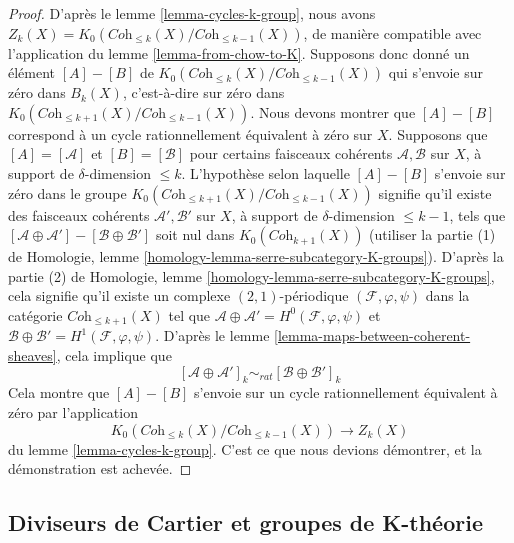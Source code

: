 \begin{proof}
D'après le lemme \ref{lemma-cycles-k-group}, nous avons
$Z_k(X) = K_0(\textit{Coh}_{\leq k}(X)/\textit{Coh}_{\leq k - 1}(X))$,
de manière compatible avec l'application du lemme \ref{lemma-from-chow-to-K}.
Supposons donc donné un élément $[A] - [B]$ de
$K_0(\textit{Coh}_{\leq k}(X)/\textit{Coh}_{\leq k - 1}(X))$
qui s'envoie sur zéro dans $B_k(X)$, c'est-à-dire sur zéro dans
$K_0(\textit{Coh}_{\leq k + 1}(X)/\textit{Coh}_{\leq k - 1}(X))$.
Nous devons montrer que $[A] - [B]$ correspond à un cycle
rationnellement équivalent à zéro sur $X$.
Supposons que $[A] = [\mathcal{A}]$ et $[B] = [\mathcal{B}]$
pour certains faisceaux cohérents $\mathcal{A}, \mathcal{B}$ sur
$X$, à support de $\delta$-dimension $\leq k$.
L'hypothèse selon laquelle $[A] - [B]$ s'envoie sur zéro dans le groupe
$K_0(\textit{Coh}_{\leq k + 1}(X)/\textit{Coh}_{\leq k - 1}(X))$
signifie qu'il existe des faisceaux cohérents
$\mathcal{A}', \mathcal{B}'$ sur $X$, à support de
$\delta$-dimension $\leq k - 1$, tels que
$[\mathcal{A} \oplus \mathcal{A}'] - [\mathcal{B} \oplus \mathcal{B}']$
soit nul dans $K_0(\textit{Coh}_{k + 1}(X))$ (utiliser la partie (1) de
Homologie, lemme \ref{homology-lemma-serre-subcategory-K-groups}).
D'après la partie (2) de
Homologie, lemme \ref{homology-lemma-serre-subcategory-K-groups},
cela signifie qu'il existe un complexe $(2, 1)$-périodique
$(\mathcal{F}, \varphi, \psi)$ dans la catégorie $\textit{Coh}_{\leq k + 1}(X)$
tel que
$\mathcal{A} \oplus \mathcal{A}' = H^0(\mathcal{F}, \varphi, \psi)$
et $\mathcal{B} \oplus \mathcal{B}' = H^1(\mathcal{F}, \varphi, \psi)$.
D'après le lemme \ref{lemma-maps-between-coherent-sheaves},
cela implique que
$$
[\mathcal{A} \oplus \mathcal{A}']_k
\sim_{rat}
[\mathcal{B} \oplus \mathcal{B}']_k
$$
Cela montre que $[A] - [B]$ s'envoie sur un cycle rationnellement
équivalent à zéro par l'application
$$
K_0(\textit{Coh}_{\leq k}(X)/\textit{Coh}_{\leq k - 1}(X))
\longrightarrow Z_k(X)
$$
du lemme \ref{lemma-cycles-k-group}. C'est ce que nous
devions démontrer, et la démonstration est achevée.
\end{proof}














\subsection{Diviseurs de Cartier et groupes de K-théorie}
\label{subsection-cartier-coherent}

